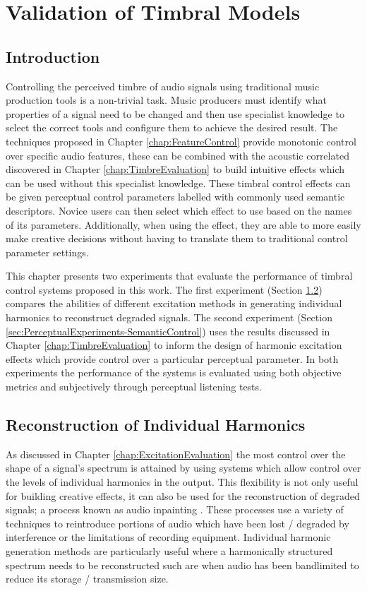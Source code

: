 \chapter{Validation of Timbral Models}
\label{chap:PerceptualExperiments}

\section{Introduction}
\label{sec:PerceptualExperiments-Introduction}
	Controlling the perceived timbre of audio signals using traditional music production tools is a non-trivial task.
	Music producers must identify what properties of a signal need to be changed and then use specialist knowledge to
	select the correct tools and configure them to achieve the desired result. The techniques proposed in Chapter
	\ref{chap:FeatureControl} provide monotonic control over specific audio features, these can be combined with the
	acoustic correlated discovered in Chapter \ref{chap:TimbreEvaluation} to build intuitive effects which can be used
	without this specialist knowledge. These timbral control effects can be given perceptual control parameters
	labelled with commonly used semantic descriptors. Novice users can then select which effect to use based on the
	names of its parameters. Additionally, when using the effect, they are able to more easily make creative decisions
	without having to translate them to traditional control parameter settings.

	This chapter presents two experiments that evaluate the performance of timbral control systems proposed in this
	work. The first experiment (Section \ref{sec:PerceptualExperiments-Reconstruction}) compares the abilities of
	different excitation methods in generating individual harmonics to reconstruct degraded signals. The second
	experiment (Section \ref{sec:PerceptualExperiments-SemanticControl}) uses the results discussed in Chapter
	\ref{chap:TimbreEvaluation} to inform the design of harmonic excitation effects which provide control over a
	particular perceptual parameter. In both experiments the performance of the systems is evaluated using both
	objective metrics and subjectively through perceptual listening tests.

\section{Reconstruction of Individual Harmonics}
\label{sec:PerceptualExperiments-Reconstruction}
	As discussed in Chapter \ref{chap:ExcitationEvaluation} the most control over the shape of a signal's spectrum is
	attained by using systems which allow control over the levels of individual harmonics in the output. This
	flexibility is not only useful for building creative effects, it can also be used for the reconstruction of
	degraded signals; a process known as audio inpainting \citep{adler2012audio}. These processes use a variety of
	techniques to reintroduce portions of audio which have been lost / degraded by interference or the limitations of
	recording equipment. Individual harmonic generation methods are particularly useful where a harmonically structured
	spectrum needs to be reconstructed such are when audio has been bandlimited to reduce its storage / transmission
	size.

